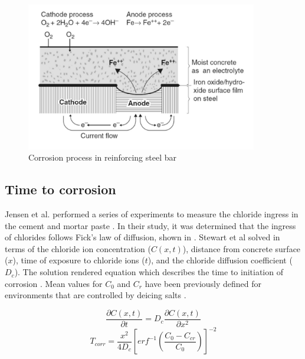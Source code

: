 \begin{figure}[htbp]
\centering
\includegraphics[width=0.9\textwidth]{Chapter-2/figs/Corrosion_Process}
\caption{Corrosion process in reinforcing steel bar \cite{Mehta2014}}
\label{fig:corr1}
\end{figure}

\subsection{Time to corrosion}

 Jensen et al. performed a series of experiments to measure the chloride ingress in the cement and mortar paste  \cite{Jensen1999}. In their study, it was determined that the ingress of chlorides follows Fick's law of diffusion, shown in . Stewart et al solved   in terms of the chloride ion concentration ($C(x,t)$), distance from concrete surface ($x$), time of exposure to chloride ions ($t$), and the chloride diffusion coefficient ($D_c$). The solution rendered equation  which describes the time to initiation of corrosion    \cite{Stewart1998}\cite{Y.Liu1998a}\cite{Thoft-Christensen}. Mean values for $C_0$ and $C_r$ have been previously defined for environments that are controlled by deicing salts \cite{Ghosh2010}\cite{Weyers1994}\cite{Enright1998}.

\begin{equation}
	\frac{\partial C(x,t)}{\partial t} = D_c \frac{\partial C(x,t)}{\partial x^2}
	\label{eq:ficks_law}
\end{equation}
\newline
\begin{equation}
  T_{corr}=\frac{x^2}{4 D_c} \left[erf^{-1} \left(\frac{C_0-C_{cr}}{C_0} \right) \right]^{-2}
  \label{eq.three}
\end{equation} 

